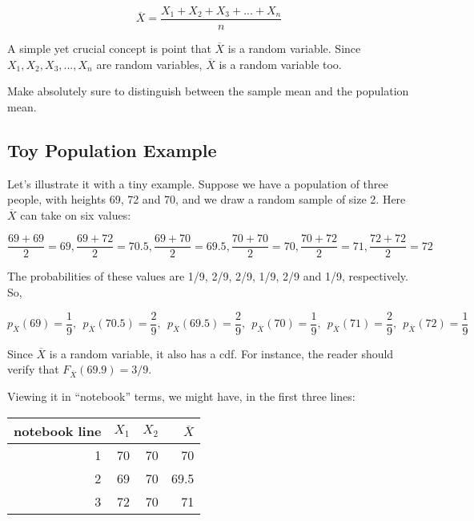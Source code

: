 \begin{equation}
\label{xbardef}
\overline{X} = \frac{X_1 + X_2 + X_3 + ... + X_n}{n}
\end{equation}

A simple yet crucial concept is point that $\overline{X}$ is a random
variable.  Since $X_1, X_2, X_3,...,X_n$ are random variables,
$\overline{X}$ is a random variable too.  

Make absolutely sure to distinguish between the sample mean and the
population mean.  

\subsection{Toy Population Example}
\label{threeyahn}

Let's illustrate it with a tiny example.  Suppose we
have a population of three people, with heights 69, 72 and 70, and we
draw a random sample of size 2.  Here $\overline{X}$ can take on six
values:

\begin{equation}
\frac{69+69}{2} = 69,
\frac{69+72}{2} = 70.5,
\frac{69+70}{2} = 69.5,
\frac{70+70}{2} = 70,
\frac{70+72}{2} = 71,
\frac{72+72}{2} = 72
\end{equation}

The probabilities of these values are 1/9, 2/9, 2/9, 1/9, 2/9 and 1/9,
respectively.  So,

\begin{equation}
\label{pmfxbar}
p_{\overline{X}}(69) = \frac{1}{9}, ~~
p_{\overline{X}}(70.5) = \frac{2}{9}, ~~
p_{\overline{X}}(69.5) = \frac{2}{9}, ~~
p_{\overline{X}}(70) = \frac{1}{9}, ~~
p_{\overline{X}}(71) = \frac{2}{9}, ~~
p_{\overline{X}}(72) = \frac{1}{9} ~~
\end{equation}

Since $\overline{X}$ is a random variable, it also has a cdf.  For
instance, the reader should verify that $F_{\overline{X}}(69.9) = 3/9$.

Viewing it in ``notebook'' terms, we might have, in the first three
lines:

\begin{tabular}{|r|r|r|r|}
\hline
notebook line & $X_1$ & $X_2$ & $\overline{X}$  \\ \hline
\hline
1 & 70 & 70 & 70 \\ \hline
2 & 69 & 70 & 69.5 \\ \hline
3 & 72 & 70 & 71 \\ \hline
\end{tabular}

